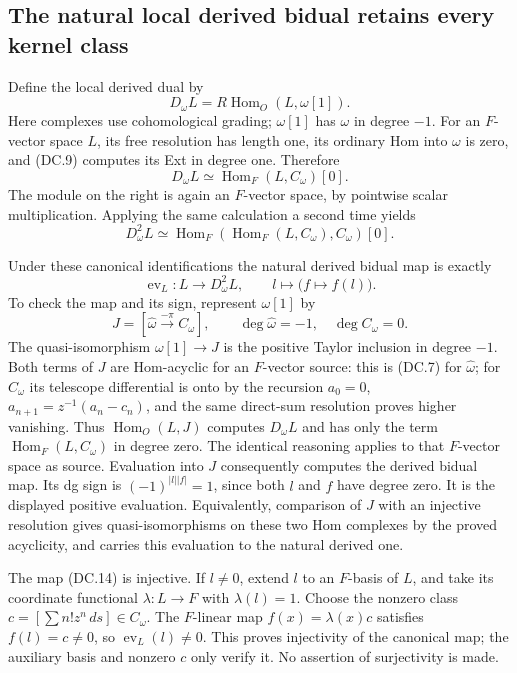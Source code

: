 \subsection{The natural local derived bidual retains every kernel class}

Define the local derived dual by
\[
 D_\omega L=R\operatorname{Hom}_O(L,\omega[1]).
 \tag{DC.11}
\]
Here complexes use cohomological grading; $\omega[1]$ has
$\omega$ in degree $-1$.  For an $F$-vector space $L$, its free
resolution has length one, its ordinary Hom into $\omega$ is zero,
and (DC.9) computes its Ext in degree one.  Therefore
\[
 D_\omega L\simeq\operatorname{Hom}_F(L,C_\omega)[0].
 \tag{DC.12}
\]
The module on the right is again an $F$-vector space, by pointwise
scalar multiplication.  Applying the same calculation a second
time yields
\[
 D_\omega^2 L\simeq
 \operatorname{Hom}_F(\operatorname{Hom}_F(L,C_\omega),C_\omega)[0].
 \tag{DC.13}
\]

Under these canonical identifications the natural derived bidual
map is exactly
\[
 \operatorname{ev}_L:L\longrightarrow D_\omega^2L,
 \qquad l\longmapsto\bigl(f\longmapsto f(l)\bigr).
 \tag{DC.14}
\]
To check the map and its sign, represent $\omega[1]$ by
\[
 J=[\widehat\omega\xrightarrow{-\pi}C_\omega],
 \qquad\deg\widehat\omega=-1,\quad\deg C_\omega=0.
 \tag{DC.15}
\]
The quasi-isomorphism $\omega[1]\to J$ is the positive Taylor
inclusion in degree $-1$.  Both terms of $J$ are Hom-acyclic for
an $F$-vector source: this is (DC.7) for $\widehat\omega$;
for $C_\omega$ its telescope differential is onto by the recursion
$a_0=0$, $a_{n+1}=z^{-1}(a_n-c_n)$, and the same direct-sum
resolution proves higher vanishing.  Thus
$\operatorname{Hom}_O(L,J)$ computes $D_\omega L$ and has only
the term $\operatorname{Hom}_F(L,C_\omega)$ in degree zero.
The identical reasoning applies to that $F$-vector space as source.
Evaluation into $J$ consequently computes the derived bidual map.
Its dg sign is $(-1)^{|l||f|}=1$, since both $l$ and $f$ have
degree zero.  It is the displayed positive evaluation.  Equivalently,
comparison of $J$ with an injective resolution gives
quasi-isomorphisms on these two Hom complexes by the proved
acyclicity, and carries this evaluation to the natural derived one.

The map (DC.14) is injective.  If $l\ne0$, extend $l$ to an
$F$-basis of $L$, and take its coordinate functional
$\lambda:L\to F$ with $\lambda(l)=1$.  Choose the nonzero class
$c=[\sum n!z^n\,ds]\in C_\omega$.  The $F$-linear map
$f(x)=\lambda(x)c$ satisfies $f(l)=c\ne0$, so
$\operatorname{ev}_L(l)\ne0$.  This proves injectivity of the
canonical map; the auxiliary basis and nonzero $c$ only verify it.
No assertion of surjectivity is made.

